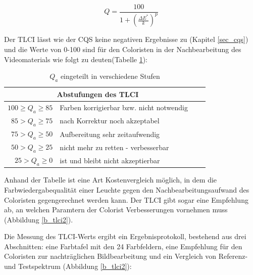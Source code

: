 \begin{equation}\label{gl_tlci2}
		Q = \frac{100}{1+(\frac{\Delta E^{*}}{k})^{p}}
\end{equation}

Der TLCI lässt wie der CQS keine negativen Ergebnisse zu (Kapitel \ref{sec_cqs}) und die Werte von 0-100 sind für den Coloristen in der Nachbearbeitung des Videomaterials wie folgt zu deuten(Tabelle \ref{t_tlci}):

	\begin{table}[htp] 
		\centering
		\begin{tabular}{rlcc}  %
		\toprule
		\multicolumn{2}{c}{\large\sffamily Abstufungen des TLCI}\\ 							
		\midrule
		$100 \geq  Q_{a} \geq 85$  & Farben korrigierbar bzw. nicht notwendig\\ 
		$85 > Q_{a} \geq 75$ & nach Korrektur noch akzeptabel\\
		$75 > Q_{a} \geq 50$ & Aufbereitung sehr zeitaufwendig\\
		$50 > Q_{a} \geq 25$ & nicht mehr zu retten - verbesserbar\\
		$25 > Q_{a} \geq 0$ & ist und bleibt nicht akzeptierbar\\
		\bottomrule
		\end{tabular}
		\caption{$Q_{a}$ eingeteilt in verschiedene Stufen\protect\footnotemark}	
		\label{t_tlci}
	\end{table}
Anhand der Tabelle ist eine Art Kostenvergleich möglich, in dem die Farbwiedergabequalität einer Leuchte gegen den Nachbearbeitungsaufwand des Coloristen gegengerechnet werden kann. Der TLCI gibt sogar eine Empfehlung ab, an welchen Paramtern der Colorist Verbesserungen vornehmen muss (Abbildung \ref{b_tlci2}).\newpage 

Die Messung des TLCI-Werts ergibt ein Ergebnisprotokoll, bestehend aus drei Abschnitten: eine Farbtafel mit den 24 Farbfeldern, eine Empfehlung für den Coloristen zur nachträglichen Bildbearbeitung und ein Vergleich von Referenz- und Testspektrum (Abbildung \ref{b_tlci2}):\\ 

